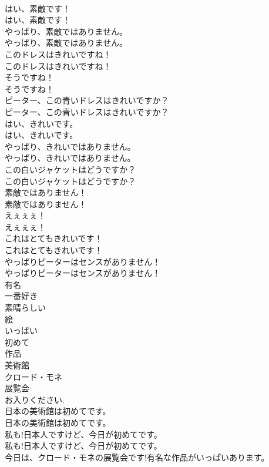 \documentclass[8pt]{extreport}
\begin{document}
\begin{CJK}{UTF8}{min}
\\	はい、素敵です！	
\\	はい、素敵です！ 
\\	やっぱり、素敵ではありません。	
\\	やっぱり、素敵ではありません。 
\\	このドレスはきれいですね！	
\\	このドレスはきれいですね！ 
\\	そうですね！	
\\	そうですね！ 
\\	ピーター、この青いドレスはきれいですか？	
\\	ピーター、この青いドレスはきれいですか？ 
\\	はい、きれいです。	
\\	はい、きれいです。 
\\	やっぱり、きれいではありません。	
\\	やっぱり、きれいではありません。 
\\	この白いジャケットはどうですか？	
\\	この白いジャケットはどうですか？ 
\\	素敵ではありません！	
\\	素敵ではありません！ 
\\	えぇぇぇ！	
\\	えぇぇぇ！ 
\\	これはとてもきれいです！	
\\	これはとてもきれいです！ 
\\	やっぱりピーターはセンスがありません！	
\\	やっぱりピーターはセンスがありません！ 
\\	有名
\\	一番好き
\\	素晴らしい
\\	絵
\\	いっぱい
\\	初めて
\\	作品
\\	美術館
\\	クロード・モネ
\\	展覧会
\\	お入りください.
\\	日本の美術館は初めてです。	
\\	日本の美術館は初めてです。 
\\	私も!日本人ですけど、今日が初めてです。	
\\	私も!日本人ですけど、今日が初めてです。 
\\	今日は、クロード・モネの展覧会です!有名な作品がいっぱいあります。	

\end{CJK}
\end{document}
